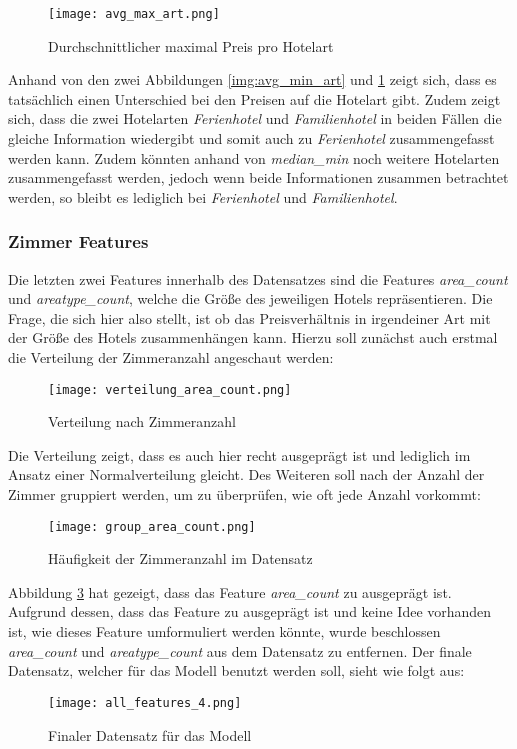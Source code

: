 \begin{figure}[h]
    \centering
    \texttt{[image: avg\_max\_art.png]}
    \caption[Durchschnittlicher maximal Preis pro Hotelart]{Durchschnittlicher maximal Preis pro Hotelart}
    \label{img:avg_max_art}
\end{figure}

Anhand von den zwei Abbildungen \ref{img:avg_min_art} und \ref{img:avg_max_art} zeigt sich, dass es tatsächlich einen Unterschied bei den Preisen auf die Hotelart gibt. Zudem zeigt sich, dass die zwei Hotelarten \emph{Ferienhotel} und \emph{Familienhotel} in beiden Fällen die gleiche Information wiedergibt und somit auch zu \emph{Ferienhotel} zusammengefasst werden kann. Zudem könnten anhand von \emph{median\_min} noch weitere Hotelarten zusammengefasst werden, jedoch wenn beide Informationen zusammen betrachtet werden, so bleibt es lediglich bei \emph{Ferienhotel} und \emph{Familienhotel}.

\subsubsection{Zimmer Features}
Die letzten zwei Features innerhalb des Datensatzes sind die Features \emph{area\_count} und \emph{areatype\_count}, welche die Größe des jeweiligen Hotels repräsentieren. Die Frage, die sich hier also stellt, ist ob das Preisverhältnis in irgendeiner Art mit der Größe des Hotels zusammenhängen kann. Hierzu soll zunächst auch erstmal die Verteilung der Zimmeranzahl angeschaut werden:

\begin{figure}[h]
    \centering
    \texttt{[image: verteilung\_area\_count.png]}
    \caption[Verteilung nach Zimmeranzahl]{Verteilung nach Zimmeranzahl}
    \label{img:verteilung_area_count}
\end{figure}

Die Verteilung zeigt, dass es auch hier recht ausgeprägt ist und lediglich im Ansatz einer Normalverteilung gleicht. Des Weiteren soll nach der Anzahl der Zimmer gruppiert werden, um zu überprüfen, wie oft jede Anzahl vorkommt:

\begin{figure}[h]
    \centering
    \texttt{[image: group\_area\_count.png]}
    \caption[Häufigkeit der Zimmeranzahl im Datensatz]{Häufigkeit der Zimmeranzahl im Datensatz}
    \label{img:haufigkeit_area_count}
\end{figure}
Abbildung \ref{img:haufigkeit_area_count} hat gezeigt, dass das Feature \emph{area\_count} zu ausgeprägt ist. Aufgrund dessen, dass das Feature zu ausgeprägt ist und keine Idee vorhanden ist, wie dieses Feature umformuliert werden könnte, wurde beschlossen \emph{area\_count} und \emph{areatype\_count} aus dem Datensatz zu entfernen.
\newline
\newline
Der finale Datensatz, welcher für das Modell benutzt werden soll, sieht wie folgt aus:

\begin{figure}[h]
    \centering
    \texttt{[image: all\_features\_4.png]}
    \caption[Finaler Datensatz für das Modell]{Finaler Datensatz für das Modell}
    \label{img:all_features_4}
\end{figure}